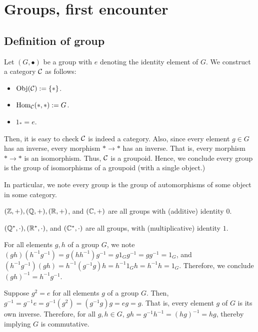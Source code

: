 \chapter{Groups, first encounter}

\section{Definition of group}
\begin{xca}
Let $(G, \bullet)$ be a group with $e$ denoting the identity element of $G$. We
construct a category $\mathcal{C}$ as follows:
\begin{itemize}
    \item $\operatorname{Obj}(\mathcal{C}) := \{ \ast \}$.
    \item $\operatorname{Hom}_{\mathcal{C}}(\ast, \ast) := G$.
    \item $1_{\ast} = e$.
\end{itemize}
Then, it is easy to check $\mathcal{C}$ is indeed a category. Also, since every
element $g \in G$ has an inverse, every morphism $\ast \to \ast$ has an inverse.
That is, every morphism $\ast \to \ast$ is an isomorphism. Thus, $\mathcal{C}$ is a
groupoid. Hence, we conclude every group is the group of isomorphisms of a
groupoid (with a single object.)

In particular, we note every group is the group of automorphisms of some object
in some category.
\end{xca}

\begin{xca}
$(\mathbb{Z}, +), (\mathbb{Q}, +), (\mathbb{R}, +)$, and $(\mathbb{C}, +)$ are all groups with (additive)
identity $0$.

$(\mathbb{Q}^*, \cdot), (\mathbb{R}^*, \cdot)$, and $(\mathbb{C}^*, \cdot)$ are all groups, with
(multiplicative) identity $1$.
\end{xca}

\begin{xca}
For all elements $g, h$ of a group $G$, we note $(gh)(h^{-1} g^{-1}) =
g(h h^{-1})g^{-1} = g 1_G g^{-1} = g g^{-1} = 1_G$, and $(h^{-1} g^{-1})(gh) =
h^{-1}(g^{-1}g)h = h^{-1} 1_G h = h^{-1} h = 1_G$. Therefore, we conclude
$(gh)^{-1} = h^{-1} g^{-1}$.
\end{xca}

\begin{xca}
Suppose $g^2 = e$ for all elements $g$ of a group $G$. Then, $g^{-1} = g^{-1} e
= g^{-1}(g^2) = (g^{-1} g) g = e g = g$. That is, every element $g$ of $G$ is
its own inverse. Therefore, for all $g, h \in G$, $gh = g^{-1} h^{-1} =
(hg)^{-1} = hg$, thereby implying $G$ is commutative.
\end{xca}
